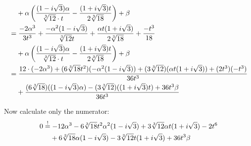 \begin{align}
    &\hphantom{{}=}+ \alpha \left ( \frac{(1-i \sqrt{3}) \alpha}{\sqrt[3]{12} \cdot t} -\frac{(1+i\sqrt{3}) t}{2\sqrt[3]{18}}\right )
       + \beta\\%
    &= \frac{-2 \alpha^3}{3t^3}
       + \frac{-\alpha^2 (1-i \sqrt{3})}{\sqrt[3]{12} t}
       + \frac{\alpha t (1+i \sqrt{3})}{2\sqrt[3]{18}}
       + \frac{- t^3}{18}\\
    &\hphantom{{}=}+ \alpha \left ( \frac{(1-i \sqrt{3}) \alpha}{\sqrt[3]{12} \cdot t} -\frac{(1+i\sqrt{3}) t}{2\sqrt[3]{18}}\right )
       + \beta\\%
    &= \frac{12 \cdot (-2 \alpha^3) +(6 \sqrt[3]{18}t^2)(-\alpha^2 (1-i \sqrt{3}))+ (3 \sqrt[3]{12})(\alpha t (1+i \sqrt{3})) + (2t^3)(- t^3)}{36t^3}\\
    &\hphantom{{}=}+ \frac{(6 \sqrt[3]{18})((1-i \sqrt{3}) \alpha) - (3 \sqrt[3]{12})((1+i\sqrt{3}) t) + 36t^3 \beta}{36t^3}\\%
\end{align}

\goodbreak
Now calculate only the numerator:
\begin{align}
    0 &\stackrel{!}{=} -12 \alpha^3 - 6 \sqrt[3]{18} t^2 \alpha^2 (1 - i \sqrt{3})
        + 3 \sqrt[3]{12} \alpha t (1+i\sqrt{3}) - 2t^6\\
      &\hphantom{{}=} + 6\sqrt[3]{18} \alpha (1- i \sqrt{3})
        - 3 \sqrt[3]{12} t (1+i \sqrt{3}) + 36 t^3 \beta
\end{align}
